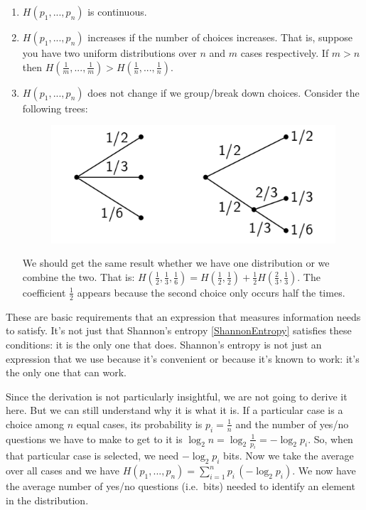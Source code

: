 \documentclass[aps,pra,10pt,floatfix,nofootinbib]{revtex4-1}
\theoremstyle{definition}
\begin{document}
\begin{enumerate}
	\item $H(p_1, ..., p_n)$ is continuous.
	\item $H(p_1, ..., p_n)$ increases if the number of choices increases. That is, suppose you have two uniform distributions over $n$ and $m$ cases respectively. If $m>n$ then $H(\frac{1}{m}, ..., \frac{1}{m})>H(\frac{1}{n}, ..., \frac{1}{n})$.
	\item $H(p_1, ..., p_n)$ does not change if we group/break down choices. Consider the following trees:
	\begin{figure}[h]
	\includegraphics[scale=0.50]{ShannonTree}
	\centering
	\end{figure}
	
	We should get the same result whether we have one distribution or we combine the two. That is: $H(\frac{1}{2}, \frac{1}{3}, \frac{1}{6}) = H(\frac{1}{2},\frac{1}{2}) + \frac{1}{2} H(\frac{2}{3}, \frac{1}{3})$. The coefficient $\frac{1}{2}$ appears because the second choice only occurs half the times.
\end{enumerate}

These are basic requirements that an expression that measures information needs to satisfy. It's not just that Shannon's entropy \eqref{ShannonEntropy} satisfies these conditions: it is the only one that does. Shannon's entropy is not just an expression that we use because it's convenient or because it's known to work: it's the only one that can work.

Since the derivation is not particularly insightful, we are not going to derive it here. But we can still understand why it is what it is. If a particular case is a choice among $n$ equal cases, its probability is $p_i=\frac{1}{n}$ and the number of yes/no questions we have to make to get to it is $\log_2 n = \log_2 \frac{1}{p_i} = - \log_2 p_i$. So, when that particular case is selected, we need $- \log_2 p_i$ bits. Now we take the average over all cases and we have $H(p_1, ..., p_n) = \sum_{i=1}^{n} p_i \, (- \log_2 p_i)$. We now have the average number of yes/no questions (i.e.~bits) needed to identify an element in the distribution.
\end{document}
